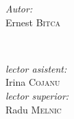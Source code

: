 \begin{titlepage}
\begin{center}
\begin{minipage}{0.4\textwidth}
\begin{flushleft} \large
\emph{Autor:}\\
		Ernest \textsc{Bitca}
		\end{flushleft}
		\end{minipage}
		~
		\begin{minipage}{0.4\textwidth}
		\begin{flushright} \large
		\emph{lector asistent:} \\
			Irina \textsc{Cojanu} \\ %
			\emph{lector superior:} \\
				Radu \textsc{Melnic} %
				\end{flushright}
				\end{minipage}\\[4cm]

				\vspace{5 mm}






					\vfill %
					\end{center}

					\end{titlepage}


